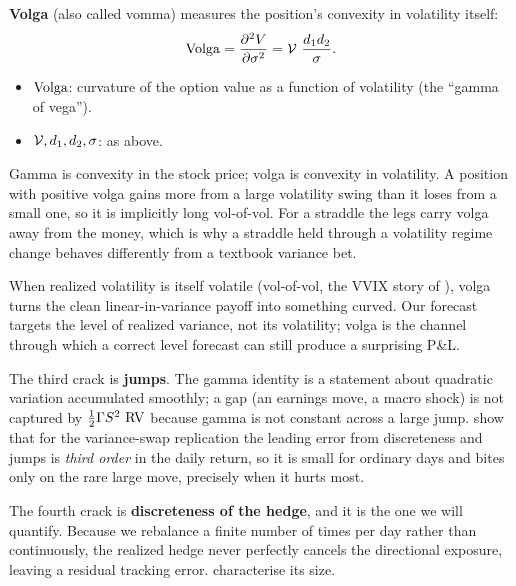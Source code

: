 \textbf{Volga} (also called vomma) measures the position's convexity in volatility itself:
\begin{equation}
\label{eq:ivrv:volga}
\operatorname{Volga} = \frac{\partial^2 V}{\partial \sigma^2} = \operatorname{\mathcal{V}}\,\frac{d_1 d_2}{\sigma}.
\end{equation}
\begin{itemize}
  \item $\operatorname{Volga}$: curvature of the option value as a function of volatility (the ``gamma of vega'').
  \item $\operatorname{\mathcal{V}}, d_1, d_2, \sigma$: as above.
\end{itemize}

\begin{intuition}
Gamma is convexity in the stock price; volga is convexity in volatility. A position with positive volga gains more from a large volatility swing than it loses from a small one, so it is implicitly long vol-of-vol. For a straddle the legs carry volga away from the money, which is why a straddle held through a volatility regime change behaves differently from a textbook variance bet.
\end{intuition}

\begin{projectconnection}
When realized volatility is itself volatile (vol-of-vol, the VVIX story of ), volga turns the clean linear-in-variance payoff into something curved. Our forecast targets the level of realized variance, not its volatility; volga is the channel through which a correct level forecast can still produce a surprising P\&L.
\end{projectconnection}

The third crack is \textbf{jumps}. The gamma identity is a statement about quadratic variation accumulated smoothly; a gap (an earnings move, a macro shock) is not captured by $\tfrac12\Gamma S^2 \,\operatorname{RV}$ because gamma is not constant across a large jump. \citet{CarrLee2009} show that for the variance-swap replication the leading error from discreteness and jumps is \emph{third order} in the daily return, so it is small for ordinary days and bites only on the rare large move, precisely when it hurts most.

The fourth crack is \textbf{discreteness of the hedge}, and it is the one we will quantify. Because we rebalance a finite number of times per day rather than continuously, the realized hedge never perfectly cancels the directional exposure, leaving a residual tracking error. \citet{BertsimasKoganLo2000} characterise its size.

